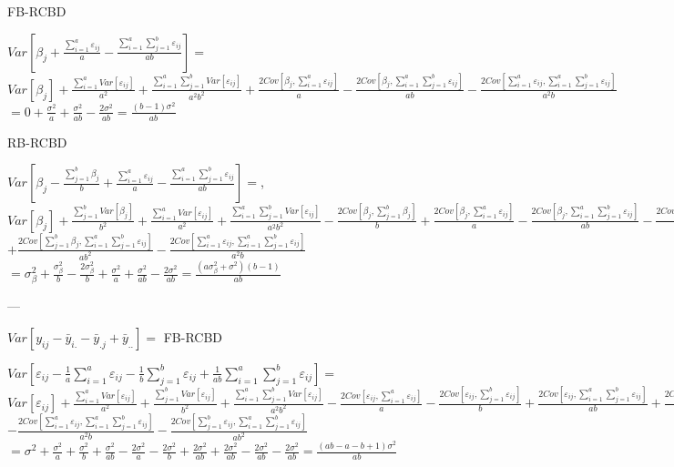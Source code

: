 \documentclass[10pt,portrait]{article}
\begin{document}
FB-RCBD

$Var[\beta_{j}+\frac{\sum_{i=1}^aε_{ij}}a-\frac{\sum_{i=1}^a\sum_{j=1}^bε_{ij}}{ab}]=$
$Var[\beta_{j}]+\frac{\sum_{i=1}^aVar[ε_{ij}]}{a^2}+\frac{\sum_{i=1}^a\sum_{j=1}^bVar[ε_{ij}]}{a^2b^2}+\frac{2Cov[\beta_{j},\sum_{i=1}^aε_{ij}]}{a}-\frac{2Cov[\beta_{j},\sum_{i=1}^a\sum_{j=1}^bε_{ij}]}{ab}-\frac{2Cov[\sum_{i=1}^aε_{ij},\sum_{i=1}^a\sum_{j=1}^bε_{ij}]}{a^2b}$
$=0+\frac{\sigma^2}{a}+\frac{\sigma^2}{ab}-\frac{2\sigma^2}{ab}=\frac{(b-1)\sigma^2}{ab}$

RB-RCBD

$Var[\beta_{j}-\frac{\sum_{j=1}^b\beta_{j}}{b}+\frac{\sum_{i=1}^aε_{ij}}a-\frac{\sum_{i=1}^a\sum_{j=1}^bε_{ij}}{ab}]=$,
$Var[\beta_{j}]+\frac{\sum_{j=1}^bVar[\beta_{j}]}{b^2}+\frac{\sum_{i=1}^aVar[ε_{ij}]}{a^2}+\frac{\sum_{i=1}^a\sum_{j=1}^bVar[ε_{ij}]}{a^2b^2}-\frac{2Cov[\beta_{j},\sum_{j=1}^b\beta_{j}]}b+\frac{2Cov[\beta_{j},\sum_{i=1}^aε_{ij}]}a-\frac{2Cov[\beta_{j},\sum_{i=1}^a\sum_{j=1}^bε_{ij}]}{ab}-\frac{2Cov[\sum_{j=1}^b\beta_{j},\sum_{i=1}^aε_{ij}]}{ab}$
$+\frac{2Cov[\sum_{j=1}^b\beta_{j},\sum_{i=1}^a\sum_{j=1}^bε_{ij}]}{ab^2}-\frac{2Cov[\sum_{i=1}^aε_{ij},\sum_{i=1}^a\sum_{j=1}^bε_{ij}]}{a^2b}$
$=\sigma_{\beta}^2+\frac{\sigma_{\beta}^2}{b}-\frac{2\sigma_{\beta}^2}{b}+\frac{\sigma^2}{a}+\frac{\sigma^2}{ab}-\frac{2\sigma^2}{ab}=\frac{(a\sigma_{\beta}^2+\sigma^2)(b-1)}{ab}$

 ---

$Var[y_{ij}-\bar y_{i.}-\bar y_{.j}+\bar y_{..}]=$
FB-RCBD

$Var[ε_{ij}-\frac1a\sum_{i=1}^aε_{ij}-\frac1b\sum_{j=1}^bε_{ij}+\frac1{ab}\sum_{i=1}^a\sum_{j=1}^bε_{ij}]=$
$Var[ε_{ij}]+\frac{\sum_{i=1}^aVar[ε_{ij}]}{a^2}+\frac{\sum_{j=1}^bVar[ε_{ij}]}{b^2}+\frac{\sum_{i=1}^a\sum_{j=1}^bVar[ε_{ij}]}{a^2b^2}-\frac{2Cov[ε_{ij},\sum_{i=1}^aε_{ij}]}{a}-\frac{2Cov[ε_{ij},\sum_{j=1}^bε_{ij}]}{b}+\frac{2Cov[ε_{ij},\sum_{i=1}^a\sum_{j=1}^bε_{ij}]}{ab}+\frac{2Cov[\sum_{i=1}^aε_{ij},\sum_{j=1}^bε_{ij}]}{ab}$
$-\frac{2Cov[\sum_{i=1}^aε_{ij},\sum_{i=1}^a\sum_{j=1}^bε_{ij}]}{a^2b}-\frac{2Cov[\sum_{j=1}^bε_{ij},\sum_{i=1}^a\sum_{j=1}^bε_{ij}]}{ab^2}$
$=\sigma^2+\frac{\sigma^2}{a}+\frac{\sigma^2}{b}+\frac{\sigma^2}{ab}-\frac{2\sigma^2}{a}-\frac{2\sigma^2}{b}+\frac{2\sigma^2}{ab}+\frac{2\sigma^2}{ab}-\frac{2\sigma^2}{ab}-\frac{2\sigma^2}{ab}=\frac{(ab-a-b+1)\sigma^2}{ab}$
\end{document}
